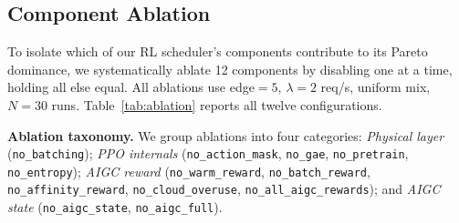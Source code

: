 \subsection{Component Ablation}
\label{sec:ablation}

To isolate which of our RL scheduler's components contribute
to its Pareto dominance, we systematically ablate 12 components
by disabling one at a time, holding all else equal. All
ablations use edge${=}5$, $\lambda{=}2$ req/s, uniform mix,
$N{=}30$ runs. Table~\ref{tab:ablation} reports all twelve
configurations.

\textbf{Ablation taxonomy.} We group ablations into four
categories: \emph{Physical layer} (\texttt{no\_batching});
\emph{PPO internals} (\texttt{no\_action\_mask},
\texttt{no\_gae}, \texttt{no\_pretrain}, \texttt{no\_entropy});
\emph{AIGC reward} (\texttt{no\_warm\_reward},
\texttt{no\_batch\_reward}, \texttt{no\_affinity\_reward},
\texttt{no\_cloud\_overuse},
\texttt{no\_all\_aigc\_rewards}); and \emph{AIGC state}
(\texttt{no\_aigc\_state}, \texttt{no\_aigc\_full}).


